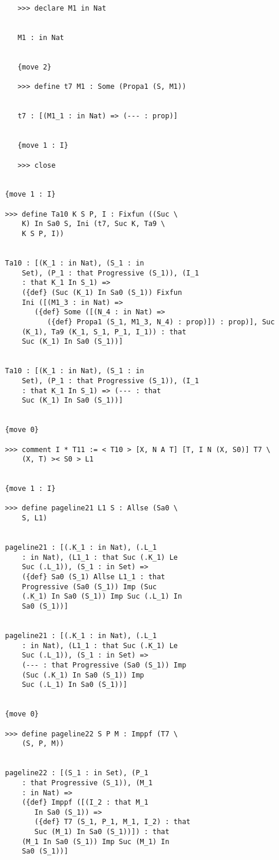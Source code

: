 \documentclass{article}
\begin{document}
\begin{verbatim}
      >>> declare M1 in Nat


      M1 : in Nat


      {move 2}

      >>> define t7 M1 : Some (Propa1 (S, M1))


      t7 : [(M1_1 : in Nat) => (--- : prop)]


      {move 1 : I}

      >>> close


   {move 1 : I}

   >>> define Ta10 K S P, I : Fixfun ((Suc \
       K) In Sa0 S, Ini (t7, Suc K, Ta9 \
       K S P, I))


   Ta10 : [(K_1 : in Nat), (S_1 : in 
       Set), (P_1 : that Progressive (S_1)), (I_1 
       : that K_1 In S_1) => 
       ({def} (Suc (K_1) In Sa0 (S_1)) Fixfun 
       Ini ([(M1_3 : in Nat) => 
          ({def} Some ([(N_4 : in Nat) => 
             ({def} Propa1 (S_1, M1_3, N_4) : prop)]) : prop)], Suc 
       (K_1), Ta9 (K_1, S_1, P_1, I_1)) : that 
       Suc (K_1) In Sa0 (S_1))]


   Ta10 : [(K_1 : in Nat), (S_1 : in 
       Set), (P_1 : that Progressive (S_1)), (I_1 
       : that K_1 In S_1) => (--- : that 
       Suc (K_1) In Sa0 (S_1))]


   {move 0}

   >>> comment I * T11 := < T10 > [X, N A T] [T, I N (X, S0)] T7 \
       (X, T) >< S0 > L1


   {move 1 : I}

   >>> define pageline21 L1 S : Allse (Sa0 \
       S, L1)


   pageline21 : [(.K_1 : in Nat), (.L_1 
       : in Nat), (L1_1 : that Suc (.K_1) Le 
       Suc (.L_1)), (S_1 : in Set) => 
       ({def} Sa0 (S_1) Allse L1_1 : that 
       Progressive (Sa0 (S_1)) Imp (Suc 
       (.K_1) In Sa0 (S_1)) Imp Suc (.L_1) In 
       Sa0 (S_1))]


   pageline21 : [(.K_1 : in Nat), (.L_1 
       : in Nat), (L1_1 : that Suc (.K_1) Le 
       Suc (.L_1)), (S_1 : in Set) => 
       (--- : that Progressive (Sa0 (S_1)) Imp 
       (Suc (.K_1) In Sa0 (S_1)) Imp 
       Suc (.L_1) In Sa0 (S_1))]


   {move 0}

   >>> define pageline22 S P M : Imppf (T7 \
       (S, P, M))


   pageline22 : [(S_1 : in Set), (P_1 
       : that Progressive (S_1)), (M_1 
       : in Nat) => 
       ({def} Imppf ([(I_2 : that M_1 
          In Sa0 (S_1)) => 
          ({def} T7 (S_1, P_1, M_1, I_2) : that 
          Suc (M_1) In Sa0 (S_1))]) : that 
       (M_1 In Sa0 (S_1)) Imp Suc (M_1) In 
       Sa0 (S_1))]



\end{verbatim}
\end{document}
